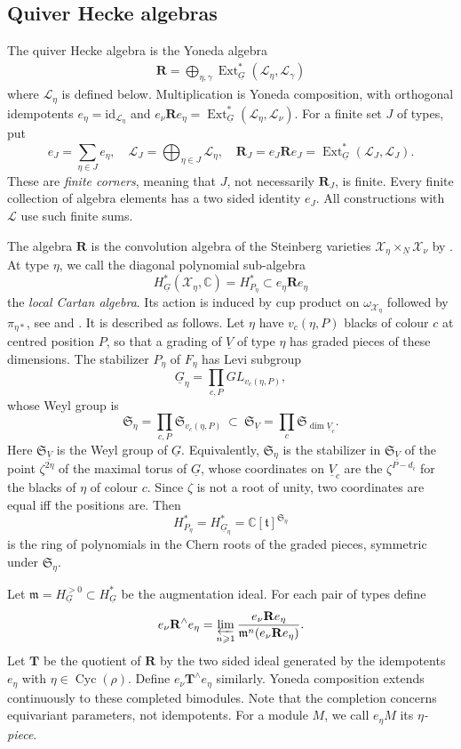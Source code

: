 \documentclass[11pt,reqno]{amsart}
\theoremstyle{definition}
\theoremstyle{remark}
\def\bbC{\mathbb C}
\def\dN{\underline N}
\def\dG{\underline G}
\def\dV{\underline V}
\def\scrX{\mathscr X}
\def\Ext{\operatorname{Ext}}
\def\Cyc{\operatorname{Cyc}}
\def\bR{\mathbf R}
\def\bT{\mathbf T}
\begin{document}
\subsection{Quiver Hecke algebras}\label{subsec:VV25}
The {quiver Hecke algebra} is the Yoneda algebra
\begin{align}\label{KLR}
\bR=\bigoplus_{\eta,\gamma}\Ext^*_{\dG}(\mathscr L_\eta,\mathscr L_\gamma)
\end{align}
where $\mathscr L_\eta$ is defined below.
Multiplication is Yoneda composition, with orthogonal idempotents
$e_\eta=\mathrm{id}_{\mathscr L_\eta}$ and
$e_\nu\bR e_\eta=\Ext^*_{\dG}(\mathscr L_\eta,\mathscr L_\nu)$.
For a finite set $J$ of types, put
\[
 e_J=\sum_{\eta\in J}e_\eta,\quad
 \mathscr L_J=\bigoplus_{\eta\in J}\mathscr L_\eta,\quad
 \bR_J=e_J\bR e_J=\Ext^*_{\dG}(\mathscr L_J,\mathscr L_J).
\]
These are \emph{finite corners}, meaning that $J$, not necessarily
$\bR_J$, is finite. Every finite collection of algebra elements has
a two sided identity $e_J$. All constructions with $\mathscr L$ use such
finite sums.

The algebra $\bR$ is the convolution algebra of the Steinberg varieties
$\scrX_\eta\times_{\dN}\scrX_{\nu}$ by \cite{CG97}. At type
$\eta$, we call the diagonal polynomial sub-algebra
\[
 H^*_{\dG}(\scrX_\eta,\bbC)=H^*_{P_\eta}
 \subset e_\eta\bR e_\eta
\]
the \emph{local Cartan algebra}. Its action is induced by cup product on
$\omega_{\scrX_\eta}$ followed by $\pi_{\eta*}$, see
\cite[\S2.1.2]{VV25} and \cite[\S8.6]{CG97}. It is described as follows. 
Let $\eta$ have $v_c(\eta,P)$ blacks of colour $c$ at centred position $P$, so that a grading of $\dV$ of type $\eta$ has
graded pieces of these dimensions. The stabilizer $P_\eta$ of $F_\eta$ has Levi subgroup 
$$\dG_\eta=\prod_{c,P}GL_{v_c(\eta,P)},$$ whose Weyl group is
\[
\mathfrak S_\eta=\prod_{c,P}\mathfrak S_{v_c(\eta,P)}\ \subset\ \mathfrak S_{\dV}=\prod_c\mathfrak S_{\dim\dV_c}.
\]
Here $\mathfrak S_{\dV}$ is the Weyl group of $\dG$. Equivalently, $\mathfrak S_\eta$ is the stabilizer in $\mathfrak S_{\dV}$ of the point $\zeta^{2\eta}$ of the maximal torus of $\dG$, whose coordinates on $\dV_c$
are the $\zeta^{P-d_i}$ for the blacks of $\eta$ of colour $c$.
Since $\zeta$ is not a root of unity, two coordinates are equal iff the positions are. Then
\[
H^*_{P_\eta}=H^*_{\dG_\eta}=\bbC[\mathfrak t]^{\mathfrak S_\eta}
\]
is the ring of polynomials in the Chern roots of the graded pieces,
symmetric under $\mathfrak S_\eta$. 

Let $\mathfrak m=H^{>0}_{\dG}\subset H^*_{\dG}$ be the augmentation
ideal. For each pair of types define
\[
 e_\nu\bR^\wedge e_\eta
 =\varprojlim_{n\geqslant1}
 \frac{e_\nu\bR e_\eta}
      {\mathfrak m^n(e_\nu\bR e_\eta)}.
\]
Let $\bT$ be the quotient of $\bR$
by the two sided ideal generated by the idempotents $e_\eta$ with $\eta\in\Cyc(\rho)$.
Define $e_\nu\bT^\wedge e_\eta$ similarly. Yoneda composition
extends continuously to these completed bimodules. 
Note that the completion concerns equivariant parameters, not idempotents.
For a module $M$, we call $e_\eta M$ its \emph{$\eta$-piece}.
\end{document}

